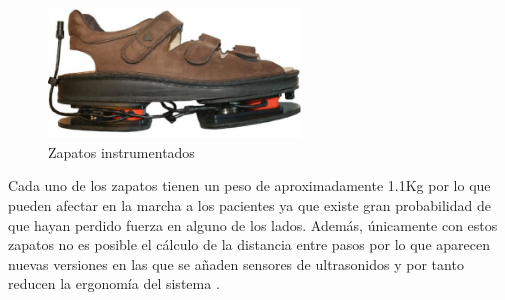 		\begin{figure}[H]
			\centering
			\includegraphics[width=0.6\textwidth]{./graphics/shoes}
			\caption{Zapatos instrumentados} \label{fig:shoes}
		\end{figure}
		 

Cada uno de los zapatos tienen un peso de aproximadamente 1.1Kg por lo que pueden afectar en la marcha a los pacientes ya que existe gran probabilidad de que hayan perdido fuerza en alguno de los lados. Además, únicamente con estos zapatos no es posible el cálculo de la distancia entre pasos por lo que aparecen nuevas versiones en las que se añaden sensores de ultrasonidos y por tanto reducen la ergonomía del sistema  \cite{shoes} . 


	
	
	